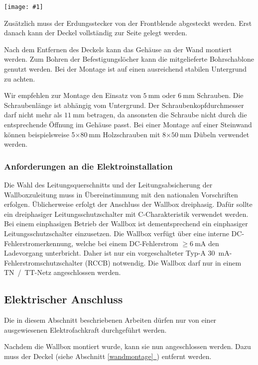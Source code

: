 \documentclass[a4paper,10pt]{article}
\newcommand{\hint}[1]{\begin{tcolorbox}[colback=boxgray,colframe=black,coltext=
white,title=Hinweis,left*=2mm,right*=2mm,boxsep=1mm,bottom=1mm,top=1mm]#1\end{tcolorbox}}
\newcommand{\gfx}[1]{\texttt{[image: \#1]}}
\newcommand*{\fullref}[1]{Abschnitt \hyperref[{#1}]{\ref*{#1}~\nameref*{#1}}}
\begin{document}
\begin{multicols*}{2}
    \gfx{./img_warp2/resized/warp2_button_and_gnd_600}

    Zusätzlich muss der Erdungsstecker von der Front\-blende abgesteckt werden.
    Erst danach kann der Deckel vollständig zur Seite gelegt werden.

    Nach dem Entfernen des Deckels kann das Gehäuse an der Wand montiert werden. Zum
    Bohren der Befestigungslöcher kann die mitgelieferte Bohrschablone genutzt
    werden. Bei der Montage ist auf einen ausreichend stabilen Untergrund zu
    achten.

    Wir empfehlen zur Montage den Einsatz von $\SI{5}{\milli\meter}$ oder
    $\SI{6}{\milli\meter}$ Schrauben. Die Schraubenlänge ist abhängig vom
    Untergrund. Der Schraubenkopfdurchmesser darf nicht mehr als
    $\SI{11}{\milli\meter}$ betragen, da ansonsten die Schraube nicht durch die
    entsprechende Öffnung im Gehäuse passt. Bei einer Montage auf einer Steinwand
    können beispielsweise 5$\times\SI{80}{\milli\meter}$ Holzschrauben
    mit 8$\times\SI{50}{\milli\meter}$ Dübeln verwendet werden.

    \subsubsection{Anforderungen an die Elektroinstallation}
    Die Wahl des Leitungsquerschnitts und der Lei\-tungs\-ab\-sicher\-ung der
    Wallboxzuleitung muss in Übereinstimmung mit den nationalen Vorschriften
    erfolgen. Üblicherweise erfolgt der Anschluss der Wallbox dreiphasig.
    Dafür sollte ein dreiphasiger Leitungsschutzschalter mit C-Charakteristik
    verwendet werden. Bei einem einphasigen Betrieb der Wallbox ist
    dementsprechend ein einphasiger Leitungsschutzschalter einzusetzen.
    Die Wallbox verfügt über eine interne DC-Fehlerstromerkennung, welche
    bei einem DC-Fehlerstrom $\geq \SI{6}{\milli\ampere}$ den Ladevorgang
    unterbricht. Daher ist nur ein vorgeschalteter Typ-A \SI{30}{\milli\ampere}-Fehlerstromschutzschalter (RCCB)
    notwendig.
    Die Wallbox darf nur in einem TN~/~TT-Netz angeschlossen werden.

    \newpage
    \subsection{Elektrischer Anschluss}
    \hint{Die in diesem Abschnitt beschriebenen Arbeiten dürfen nur von einer ausgewiesenen
        Elektrofachkraft durchgeführt werden.}

    Nachdem die Wallbox montiert wurde, kann sie nun angeschlossen werden. Dazu
    muss der Deckel (siehe \fullref{wandmontage}) entfernt werden.


\end{multicols*}
\end{document}
